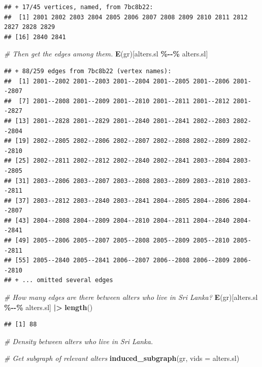\documentclass[
]{book}
\newenvironment{Shaded}{\begin{snugshade}}{\end{snugshade}}
\newcommand{\AttributeTok}[1]{\textcolor[rgb]{0.13,0.29,0.53}{#1}}
\newcommand{\CommentTok}[1]{\textcolor[rgb]{0.56,0.35,0.01}{\textit{#1}}}
\newcommand{\FunctionTok}[1]{\textcolor[rgb]{0.13,0.29,0.53}{\textbf{#1}}}
\newcommand{\NormalTok}[1]{#1}
\newcommand{\SpecialCharTok}[1]{\textcolor[rgb]{0.81,0.36,0.00}{\textbf{#1}}}
\begin{document}
\begin{verbatim}
## + 17/45 vertices, named, from 7bc8b22:
##  [1] 2801 2802 2803 2804 2805 2806 2807 2808 2809 2810 2811 2812 2827 2828 2829
## [16] 2840 2841
\end{verbatim}

\begin{Shaded}
\begin{Highlighting}[]
\CommentTok{\# Then get the edges among them.}
\FunctionTok{E}\NormalTok{(gr)[alters.sl }\SpecialCharTok{\%{-}{-}\%}\NormalTok{ alters.sl]}
\end{Highlighting}
\end{Shaded}

\begin{verbatim}
## + 88/259 edges from 7bc8b22 (vertex names):
##  [1] 2801--2802 2801--2803 2801--2804 2801--2805 2801--2806 2801--2807
##  [7] 2801--2808 2801--2809 2801--2810 2801--2811 2801--2812 2801--2827
## [13] 2801--2828 2801--2829 2801--2840 2801--2841 2802--2803 2802--2804
## [19] 2802--2805 2802--2806 2802--2807 2802--2808 2802--2809 2802--2810
## [25] 2802--2811 2802--2812 2802--2840 2802--2841 2803--2804 2803--2805
## [31] 2803--2806 2803--2807 2803--2808 2803--2809 2803--2810 2803--2811
## [37] 2803--2812 2803--2840 2803--2841 2804--2805 2804--2806 2804--2807
## [43] 2804--2808 2804--2809 2804--2810 2804--2811 2804--2840 2804--2841
## [49] 2805--2806 2805--2807 2805--2808 2805--2809 2805--2810 2805--2811
## [55] 2805--2840 2805--2841 2806--2807 2806--2808 2806--2809 2806--2810
## + ... omitted several edges
\end{verbatim}

\begin{Shaded}
\begin{Highlighting}[]
\CommentTok{\# How many edges are there between alters who live in Sri Lanka?}
\FunctionTok{E}\NormalTok{(gr)[alters.sl }\SpecialCharTok{\%{-}{-}\%}\NormalTok{ alters.sl] }\SpecialCharTok{|\textgreater{}} 
  \FunctionTok{length}\NormalTok{()}
\end{Highlighting}
\end{Shaded}

\begin{verbatim}
## [1] 88
\end{verbatim}

\begin{Shaded}
\begin{Highlighting}[]
\CommentTok{\# Density between alters who live in Sri Lanka.}

\CommentTok{\# Get subgraph of relevant alters}
\FunctionTok{induced\_subgraph}\NormalTok{(gr, }\AttributeTok{vids =}\NormalTok{ alters.sl)}
\end{Highlighting}
\end{Shaded}
\end{document}
